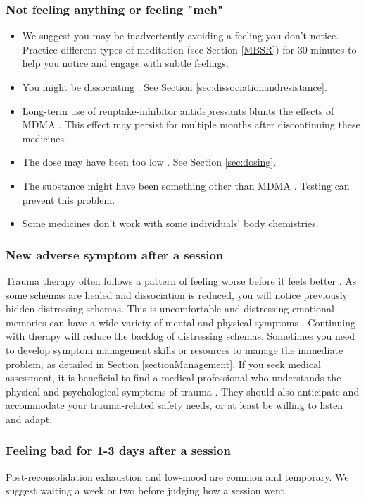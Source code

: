 \documentclass[12pt,letterpaper]{article}
\begin{document}
\subsubsection{Not feeling anything or feeling "meh"}
\begin{itemize}
    \item We suggest you may be inadvertently avoiding a feeling you don't notice. Practice different types of meditation (see Section \ref{MBSR}) for 30 minutes to help you notice and engage with subtle feelings.
    \item You might be dissociating \cite{kozlowskaDefenseCascade}. See Section \ref{sec:dissociationandresistance}.
    \item Long-term use of reuptake-inhibitor antidepressants blunts the effects of MDMA \cite{feducciaSSRIDiscontinuation}. This effect may persist for multiple months after discontinuing these medicines.
    \item The dose may have been too low \cite{bediMDMALowDose}. See Section \ref{sec:dosing}.
    \item The substance might have been something other than MDMA \cite{saleemiAdulterants}. Testing can prevent this problem.
    \item Some medicines don't work with some individuals' body chemistries.
\end{itemize}
\subsubsection{New adverse symptom after a session}
Trauma therapy often follows a pattern of feeling worse before it feels better \cite{vanderKolkBody}. As some schemas are healed and dissociation is reduced, you will notice previously hidden distressing schemas. This is uncomfortable and distressing emotional memories can have a wide variety of mental and physical symptoms \cite{kroenkeSomatic,henningsenSomatic}. Continuing with therapy will reduce the backlog of distressing schemas. Sometimes you need to develop symptom management skills or resources to manage the immediate problem, as detailed in Section \ref{sectionManagement}. If you seek medical assessment, it is beneficial to find a medical professional who understands the physical and psychological symptoms of trauma \cite{rajaTraumaInformedCare}. They should also anticipate and accommodate your trauma-related safety needs, or at least be willing to listen and adapt.
\subsubsection{Feeling bad for 1-3 days after a session}
Post-reconsolidation exhaustion and low-mood are common and temporary. We suggest waiting a week or two before judging how a session went.
\end{document}
